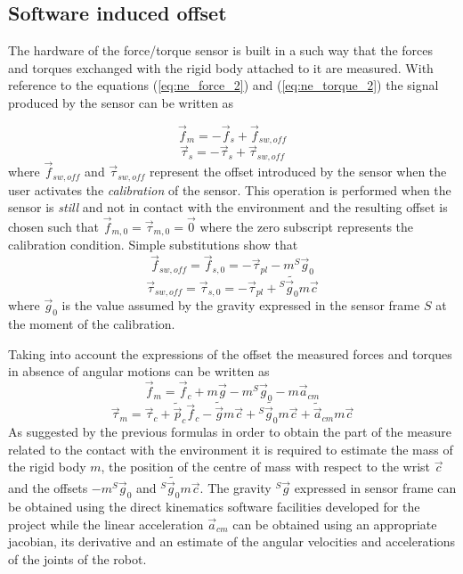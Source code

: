 \subsection{Software induced offset}
The hardware of the force/torque sensor is built in a such way that the forces and torques exchanged
with the rigid body attached to it are measured. With reference to the equations (\ref{eq:ne_force_2})
and (\ref{eq:ne_torque_2}) the signal produced by the sensor can be written as

\begin{equation*}
  \vec{f}_{m} = -\vec{f}_{s} + \vec{f}_{sw,off}
\end{equation*}
\begin{equation*}
  \vec{\tau}_{s} = -\vec{\tau}_{s} + \vec{\tau}_{sw,off}
\end{equation*}
where $\vec{f}_{sw, off}$ and $\vec{\tau}_{sw,off}$ represent the offset introduced by
the sensor when the user activates the \emph{calibration} of the sensor. This operation
is performed when the sensor is \emph{still} and not in contact with the environment
and the resulting offset is chosen such that $\vec{f}_{m,0} = \vec{\tau}_{m,0} = \vec{0}$
where the zero subscript represents the calibration condition. Simple substitutions show that
\begin{equation*}
\vec{f}_{sw,off} = \vec{f}_{s,0} = -\vec{\tau}_{pl} -m {}^S \vec{g}_{0}
\end{equation*}
\begin{equation*}
\vec{\tau}_{sw,off} = \vec{\tau}_{s,0} = -\vec{\tau}_{pl} + {}^S \tilde{\vec{g}_{0}} m\vec{c}
\end{equation*}
where $\vec{g}_{0}$ is the value assumed by the gravity expressed in the sensor frame $S$ at the
moment of the calibration.
\par
Taking into account the expressions of the offset the measured forces and torques in absence of angular
motions can be written as
\begin{equation}\label{eq:m_force_2}
  \vec{f}_{m} = \vec{f}_{c} +m \vec{g} -m {}^S \vec{g}_{0} - m  \vec{a}_{cm}
\end{equation}
\begin{equation}\label{eq:m_torque_2}
  \vec{\tau}_{m} = \vec{\tau}_{c} + \tilde{\vec{p}}_{c}  \vec{f}_{c}
  - \tilde{\vec{g}} m\vec{c} + {}^S \tilde{\vec{g}_{0}} m\vec{c} +  \tilde{\vec{a}}_{cm} m  \vec{c}
\end{equation}
As suggested by the previous formulas in order to obtain the part of the measure related to the contact
with the environment it is required to estimate the mass of the rigid body $m$, the position of the centre of
mass with respect to the wrist $\vec{c}$ and the offsets $-m {}^S \vec{g}_{0}$ and ${}^S \tilde{\vec{g}_{0}} m\vec{c}$.
The gravity ${}^S \vec{g}$ expressed in sensor frame can be obtained using the direct kinematics software facilities
developed for the project while the linear acceleration $\vec{a}_{cm}$ can be obtained using an appropriate
jacobian, its derivative and an estimate of the angular velocities and accelerations of the joints
of the robot.

